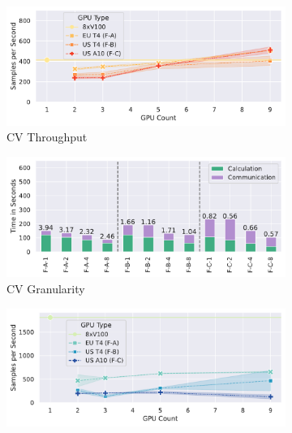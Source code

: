 \begin{figure}
    \begin{subfigure}[c]{0.24\textwidth}
        \includegraphics[width=\textwidth]{figures/misc/cv-research-setting-performance}
        \vspace{-15pt}
        \caption{CV Throughput} 
        \label{fig:cv-research-hybrid-cloud-throughput}
    \end{subfigure}
    \begin{subfigure}[c]{0.21\textwidth}
        \includegraphics[width=\textwidth]{figures/misc/cv-research-cloud-performance-granularity}  
        \caption{CV Granularity}
        \label{fig:cv-research-hybrid-cloud-granularity}
    \end{subfigure}
        \begin{subfigure}[c]{0.24\textwidth}
        \includegraphics[width=\textwidth]{figures/misc/nlp-research-setting-performance}

\end{subfigure}
\end{figure}
